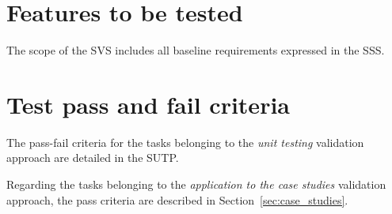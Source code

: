 \section{Features to be tested}
The scope of the SVS includes all baseline requirements expressed in the SSS.


\section{Test pass and fail criteria}
The pass-fail criteria for the tasks belonging to the \emph{unit testing} validation approach are detailed in the SUTP.

Regarding the tasks belonging to the \emph{application to the case studies} validation approach, the pass criteria are described in Section~\ref{sec:case_studies}.


%
%
%
%
%

\clearpage
